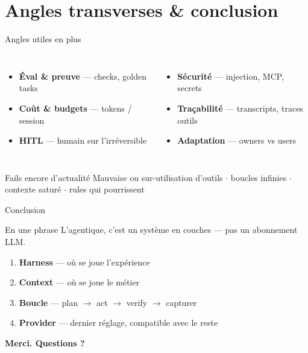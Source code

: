 \documentclass[aspectratio=169]{beamer}
\begin{document}
\section{Angles transverses \& conclusion}

\begin{frame}{Angles utiles en plus}
    \begin{columns}[T]
        \begin{itemize}
            \item \textbf{Éval \& preuve} --- checks, golden tasks
            \item \textbf{Coût \& budgets} --- tokens / session
            \item \textbf{HITL} --- humain sur l'irréversible
        \end{itemize}
        \begin{itemize}
            \item \textbf{Sécurité} --- injection, MCP, secrets
            \item \textbf{Traçabilité} --- transcripts, traces outils
            \item \textbf{Adaptation} --- owners vs users 
        \end{itemize}
    \end{columns}
    \vspace{0.6cm}
    \begin{block}{Fails encore d'actualité}
        Mauvaise ou sur-utilisation d'outils $\cdot$ boucles infinies $\cdot$ contexte saturé $\cdot$ rules qui pourrissent  
    \end{block}
\end{frame}


\begin{frame}{Conclusion}
    \begin{block}{En une phrase}
        L'agentique, c'est un système en couches --- pas un abonnement LLM.
    \end{block}
    \vspace{0.4cm}
    \begin{enumerate}
        \item \textbf{Harness} --- où se joue l'expérience 
        \item \textbf{Context} --- où se joue le métier
        \item \textbf{Boucle} --- plan $\rightarrow$ act $\rightarrow$ verify $\rightarrow$ capturer
        \item \textbf{Provider} --- dernier réglage, compatible avec le reste
    \end{enumerate}
    \vspace{0.6cm}
    \centering
    \Large \textbf{Merci. Questions ?}
\end{frame}
\end{document}

